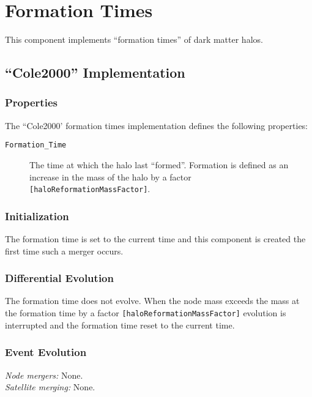 \section{Formation Times}\label{sec:ComponentFormationTimes}

This component implements ``formation times'' of dark matter halos.

\subsection{``Cole2000'' Implementation}

\subsubsection{Properties}

The ``Cole2000' formation times implementation defines the following properties:
\begin{description}
 \item [{\tt Formation\_Time}] The time at which the halo last ``formed''. Formation is defined as an increase in the mass of the halo by a factor {\tt [haloReformationMassFactor]}.
\end{description}

\subsubsection{Initialization}

The formation time is set to the current time and this component is created the first time such a merger occurs.

\subsubsection{Differential Evolution}

The formation time does not evolve. When the node mass exceeds the mass at the formation time by a factor {\tt [haloReformationMassFactor]} evolution is interrupted and the formation time reset to the current time.

\subsubsection{Event Evolution}

\noindent\emph{Node mergers:} None.\\

\noindent\emph{Satellite merging:} None.\\

